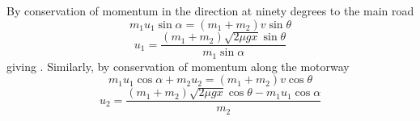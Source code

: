 \begin{problem}
{By conservation of momentum in the direction at ninety degrees to the main road 
\begin{equation} m_1 u_1  \sin \alpha = (m_1+m_2)v  \sin \theta  \end{equation}
\begin{equation} u_1 =  \frac{(m_1+m_2) \sqrt{2\mu gx}\sin \theta}{m_1 \sin \alpha}\end{equation}
giving .
Similarly, by conservation of momentum along the motorway 
\begin{equation} m_1 u_1 \cos \alpha + m_ 2 u_2 = (m_1+m_2) v \cos \theta \end{equation}
\begin{equation} u_2 =   \frac{(m_1+m_2) \sqrt{2\mu gx}\cos \theta - m_1 u_1  \cos \alpha}{m_2}\end{equation} 
}
\end{problem}
%


